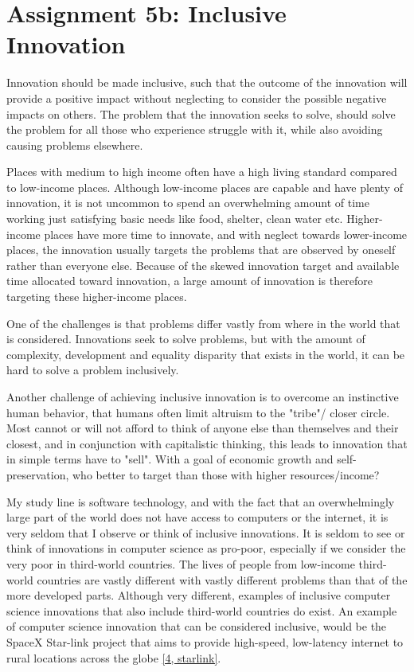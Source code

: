 \section*{Assignment 5b: Inclusive Innovation} 

Innovation should be made inclusive, such that the outcome of the innovation will provide a positive impact without neglecting to consider the possible negative impacts on others.
The problem that the innovation seeks to solve, should solve the problem for all those who experience struggle with it, while also avoiding causing problems elsewhere. 

Places with medium to high income often have a high living standard compared to low-income places. 
Although low-income places are capable and have plenty of innovation, it is not uncommon to spend an overwhelming amount of time working just satisfying basic needs like food, shelter, clean water etc. 
Higher-income places have more time to innovate, and with neglect towards lower-income places, the innovation usually targets the problems that are observed by oneself rather than everyone else.
Because of the skewed innovation target and available time allocated toward innovation, a large amount of innovation is therefore targeting these higher-income places.

One of the challenges is that problems differ vastly from where in the world that is considered. 
Innovations seek to solve problems, but with the amount of complexity, development and equality disparity that exists in the world, it can be hard to solve a problem inclusively.

Another challenge of achieving inclusive innovation is to overcome an instinctive human behavior, that humans often limit altruism to the "tribe"/ closer circle.
Most cannot or will not afford to think of anyone else than themselves and their closest, and in conjunction with capitalistic thinking, this leads to innovation that in simple terms have to "sell".
With a goal of economic growth and self-preservation, who better to target than those with higher resources/income?

My study line is software technology, and with the fact that an overwhelmingly large part of the world does not have access to computers or the internet, it is very seldom that I observe or think of inclusive innovations. 
It is seldom to see or think of innovations in computer science as pro-poor, especially if we consider the very poor in third-world countries.
The lives of people from low-income third-world countries are vastly different with vastly different problems than that of the more developed parts.
Although very different, examples of inclusive computer science innovations that also include third-world countries do exist.
An example of computer science innovation that can be considered inclusive, would be the SpaceX Star-link project that aims to provide high-speed, low-latency internet to rural locations across the globe \href{https://www.starlink.com/}{[4, starlink]}. 

